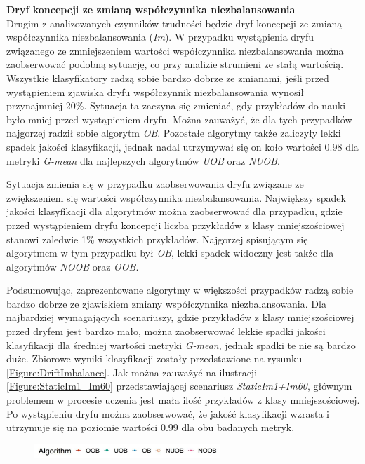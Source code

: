 \newpage

\noindent \textbf{Dryf koncepcji ze zmianą współczynnika niezbalansowania}\\

\noindent Drugim z analizowanych czynników trudności będzie dryf koncepcji ze zmianą współczynnika niezbalansowania (\textit{Im}). W przypadku wystąpienia dryfu związanego ze zmniejszeniem wartości współczynnika niezbalansowania można zaobserwować podobną sytuację, co przy analizie strumieni ze stałą wartością. Wszystkie klasyfikatory radzą sobie bardzo dobrze ze zmianami, jeśli przed wystąpieniem zjawiska dryfu współczynnik niezbalansowania wynosił przynajmniej 20\%. Sytuacja ta zaczyna się zmieniać, gdy przykładów do nauki było mniej przed wystąpieniem dryfu. Można zauważyć, że dla tych przypadków najgorzej radził sobie algorytm \textit{OB}. Pozostałe algorytmy także zaliczyły lekki spadek jakości klasyfikacji, jednak nadal utrzymywał się on koło wartości 0.98 dla metryki \textit{G-mean} dla najlepszych algorytmów \textit{UOB} oraz \textit{NUOB}.

Sytuacja zmienia się w przypadku zaobserwowania dryfu związane ze zwiększeniem się wartości współczynnika niezbalansowania. Największy spadek jakości klasyfikacji dla algorytmów można zaobserwować dla przypadku, gdzie przed wystąpieniem dryfu koncepcji liczba przykładów z klasy mniejszościowej stanowi zaledwie 1\% wszystkich przykładów. Najgorzej spisującym się algorytmem w tym przypadku był \textit{OB}, lekki spadek widoczny jest także dla algorytmów \textit{NOOB} oraz \textit{OOB}.

Podsumowując, zaprezentowane algorytmy w większości przypadków radzą sobie bardzo dobrze ze zjawiskiem zmiany współczynnika niezbalansowania. Dla najbardziej wymagających scenariuszy, gdzie przykładów z klasy mniejszościowej przed dryfem jest bardzo mało, można zaobserwować lekkie spadki jakości klasyfikacji dla średniej wartości metryki \textit{G-mean}, jednak spadki te nie są bardzo duże. Zbiorowe wyniki klasyfikacji zostały przedstawione na rysunku \ref{Figure:DriftImbalance}. Jak można zauważyć na ilustracji \ref{Figure:StaticIm1_Im60} przedstawiającej scenariusz \textit{StaticIm1+Im60}, głównym problemem w procesie uczenia jest mała ilość przykładów z klasy mniejszościowej. Po wystąpieniu dryfu można zaobserwować, że jakość klasyfikacji wzrasta i utrzymuje się na poziomie wartości 0.99 dla obu badanych metryk.

\begin{figure}[h]
    \centering
    \includegraphics[width=7cm]{figures/algorithms_legend.JPG}
\end{figure}

